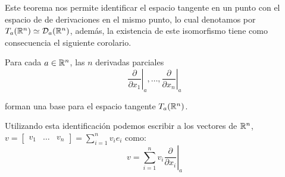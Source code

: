 Este teorema nos permite identificar el espacio tangente en un punto con el espacio de de derivaciones en el mismo punto, lo cual denotamos por $T_a(\mathbb{R}^n) \simeq \mathcal{D}_a(\mathbb{R}^n)$, además, la existencia de este isomorfismo tiene como consecuencia el siguiente corolario.

\begin{corollary}\label{Corolario: Base de TpRn}
	Para cada $a \in \mathbb{R}^n$, las $n$ derivadas parciales
	\[
		\left. \frac{\partial }{\partial x_1} \right|_{a}, \dots, \left. \frac{\partial }{\partial x_n} \right|_{a}
	\]

	forman una base para el espacio tangente $T_a(\mathbb{R}^n)$.
\end{corollary}

Utilizando esta identificación podemos escribir a los vectores de $\mathbb{R}^n$, $v = \begin{bmatrix} v_1 & \dots & v_n \end{bmatrix} = \sum_{i=1}^{n} v_i e_i$ como:
\[
	v = \left. \sum_{i = 1}^{n} v_i \frac{\partial}{\partial x_i} \right|_a
\]

